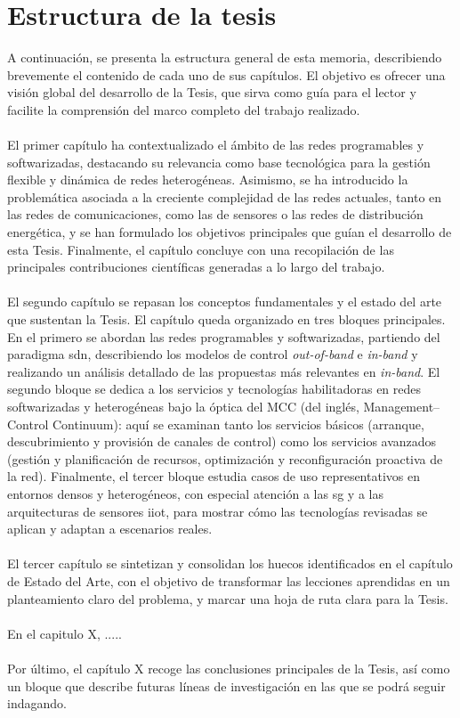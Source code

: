 \section{Estructura de la tesis}

A continuación, se presenta la estructura general de esta memoria, describiendo brevemente el contenido de cada uno de sus capítulos. El objetivo es ofrecer una visión global del desarrollo de la Tesis, que sirva como guía para el lector y facilite la comprensión del marco completo del trabajo realizado.\\
\\
El primer capítulo ha contextualizado el ámbito de las redes programables y softwarizadas, destacando su relevancia como base tecnológica para la gestión flexible y dinámica de redes heterogéneas. Asimismo, se ha introducido la problemática asociada a la creciente complejidad de las redes actuales, tanto en las redes de comunicaciones, como las de sensores o las redes de distribución energética, y se han formulado los objetivos principales que guían el desarrollo de esta Tesis. Finalmente, el capítulo concluye con una recopilación de las principales contribuciones científicas generadas a lo largo del trabajo.\\
\\
El segundo capítulo se repasan los conceptos fundamentales y el estado del arte que sustentan la Tesis. El capítulo queda organizado en tres bloques principales. En el primero se abordan las redes programables y softwarizadas, partiendo del paradigma \gls{sdn}, describiendo los modelos de control \textit{out-of-band} e \textit{in-band} y realizando un análisis detallado de las propuestas más relevantes en \textit{in-band}. El segundo bloque se dedica a los servicios y tecnologías habilitadoras en redes softwarizadas y heterogéneas bajo la óptica del MCC (del inglés, Management–Control Continuum): aquí se examinan tanto los servicios básicos (arranque, descubrimiento y provisión de canales de control) como los servicios avanzados (gestión y planificación de recursos, optimización y reconfiguración proactiva de la red). Finalmente, el tercer bloque estudia casos de uso representativos en entornos densos y heterogéneos, con especial atención a las \gls{sg} y a las arquitecturas de sensores \gls{iiot}, para mostrar cómo las tecnologías revisadas se aplican y adaptan a escenarios reales.\\
\\
El tercer capítulo se sintetizan y consolidan los huecos identificados en el capítulo de Estado del Arte, con el objetivo de transformar las lecciones aprendidas en un planteamiento claro del problema, y marcar una hoja de ruta clara para la Tesis.\\
\\
En el capitulo X, .....\\
\\
Por último, el capítulo X recoge las conclusiones principales de la Tesis, así como un bloque que describe futuras líneas de investigación en las que se podrá seguir indagando.


